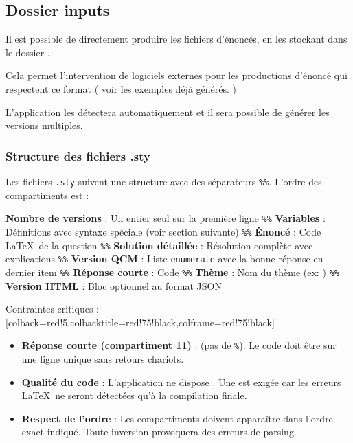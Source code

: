 \subsection{Dossier inputs}
Il est possible de directement produire les fichiers d'énoncés, en les stockant dans le dossier .

Cela permet l'intervention de logiciels externes pour les productions d'énoncé qui respectent ce format ( voir les exemples déjà générés. )

L'application les détectera automatiquement et il sera possible de générer les versions multiples.

\subsubsection{Structure des fichiers .sty}

Les fichiers \texttt{.sty} suivent une structure  avec des séparateurs \texttt{\%\%}. L'ordre des compartiments est  :

\begin{tcbenumerate}
    \tcbitem \textbf{Nombre de versions} : Un entier seul sur la première ligne
    \tcbitem \texttt{\%\%}
    \tcbitem \textbf{Variables} : Définitions avec syntaxe spéciale (voir section suivante)
    \tcbitem \texttt{\%\%}
    \tcbitem \textbf{\'Enoncé} : Code \LaTeX\ de la question
    \tcbitem \texttt{\%\%}
    \tcbitem \textbf{Solution détaillée} : Résolution complète avec explications
    \tcbitem \texttt{\%\%}
    \tcbitem \textbf{Version QCM} : Liste \texttt{enumerate} avec la bonne réponse en dernier item
    \tcbitem \texttt{\%\%}
    \tcbitem \textbf{Réponse courte} : Code 
    \tcbitem \texttt{\%\%}
    \tcbitem \textbf{Thème} : Nom du thème (ex: )
    \tcbitem \texttt{\%\%}
    \tcbitem \textbf{Version HTML} : Bloc optionnel au format JSON
\end{tcbenumerate}

\begin{bfbox}{Contraintes critiques :}[colback=red!5,colbacktitle=red!75!black,colframe=red!75!black]
\begin{itemize}
    \item \textbf{Réponse courte (compartiment 11)} :  (pas de \texttt{\%}). Le code doit être  sur une ligne unique sans retours chariots.
    \item \textbf{Qualité du code} : L'application ne dispose . Une  est exigée car les erreurs \LaTeX\ ne seront détectées qu'à la compilation finale.
    \item \textbf{Respect de l'ordre} : Les compartiments doivent apparaître dans l'ordre exact indiqué. Toute inversion provoquera des erreurs de parsing.
\end{itemize}
\end{bfbox}

